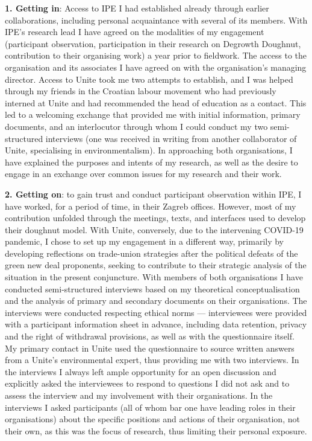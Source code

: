 \documentclass[a4paper, nobind]{templates/ociamthesis}
\begin{document}
\textbf{1. Getting in}: Access to IPE I had established already through earlier collaborations, including personal acquaintance with several of its members. With IPE's research lead I have agreed on the modalities of my engagement (participant observation, participation in their research on Degrowth Doughnut, contribution to their organising work) a year prior to fieldwork. The access to the organisation and its associates I have agreed on with the organisation's managing director. Access to Unite took me two attempts to establish, and I was helped through my friends in the Croatian labour movement who had previously interned at Unite and had recommended the head of education as a contact. This led to a welcoming exchange that provided me with initial information, primary documents, and an interlocutor through whom I could conduct my two semi-structured interviews (one was received in writing from another collaborator of Unite, specialising in environmentalism). In approaching both organisations, I have explained the purposes and intents of my research, as well as the desire to engage in an exchange over common issues for my research and their work.

\textbf{2. Getting on}: to gain trust and conduct participant observation within IPE, I have worked, for a period of time, in their Zagreb offices. However, most of my contribution unfolded through the meetings, texts, and interfaces used to develop their doughnut model. With Unite, conversely, due to the intervening COVID-19 pandemic, I chose to set up my engagement in a different way, primarily by developing reflections on trade-union strategies after the political defeats of the green new deal proponents, seeking to contribute to their strategic analysis of the situation in the present conjuncture. With members of both organisations I have conducted semi-structured interviews based on my theoretical conceptualisation and the analysis of primary and secondary documents on their organisations. The interviews were conducted respecting ethical norms --- interviewees were provided with a participant information sheet in advance, including data retention, privacy and the right of withdrawal provisions, as well as with the questionnaire itself. My primary contact in Unite used the questionnaire to source written answers from a Unite's environmental expert, thus providing me with two interviews. In the interviews I always left ample opportunity for an open discussion and explicitly asked the interviewees to respond to questions I did not ask and to assess the interview and my involvement with their organisations. In the interviews I asked participants (all of whom bar one have leading roles in their organisations) about the specific positions and actions of their organisation, not their own, as this was the focus of research, thus limiting their personal exposure.
\end{document}
